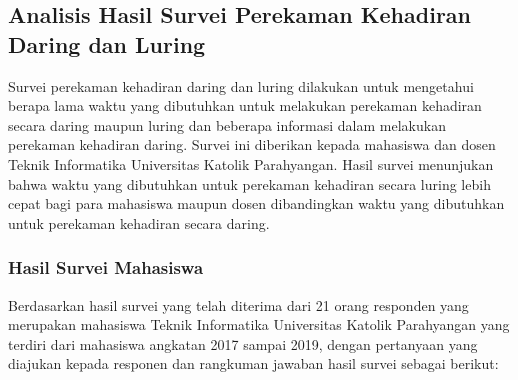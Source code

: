 \subsection{Analisis Hasil Survei Perekaman Kehadiran Daring dan Luring}
\label{sec:survei} 
Survei perekaman kehadiran daring dan luring dilakukan untuk mengetahui berapa lama waktu yang dibutuhkan untuk melakukan perekaman kehadiran secara daring maupun luring dan beberapa informasi dalam melakukan perekaman kehadiran daring. Survei ini diberikan kepada mahasiswa dan dosen Teknik Informatika Universitas Katolik Parahyangan. Hasil survei menunjukan bahwa waktu yang dibutuhkan untuk perekaman kehadiran secara luring lebih cepat bagi para mahasiswa maupun dosen dibandingkan waktu yang dibutuhkan untuk perekaman kehadiran secara daring.

\subsubsection{Hasil Survei Mahasiswa}
Berdasarkan hasil survei yang telah diterima dari 21 orang responden yang merupakan mahasiswa Teknik Informatika Universitas Katolik
Parahyangan yang terdiri dari mahasiswa angkatan 2017 sampai 2019, dengan pertanyaan yang diajukan kepada responen dan rangkuman jawaban hasil survei sebagai berikut:

